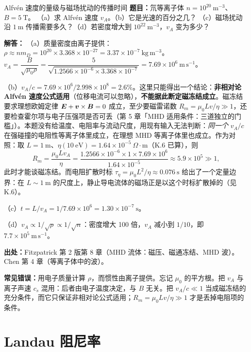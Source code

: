 \begin{example}{Alfvén 速度的量级与磁场扰动的传播时间}{}
\textbf{题目：}氘等离子体 $n=10^{20}\ \mathrm{m^{-3}}$、$B=5\ \mathrm{T}$。
（a）求 Alfvén 速度 $v_A$。（b）它是光速的百分之几？
（c）磁场扰动沿 $1\ \mathrm{m}$ 传播需要多久？（d）若密度增大到 $10^{22}\ \mathrm{m^{-3}}$，$v_A$ 变为多少？

\textbf{解答：}
（a）质量密度由离子提供：$\rho\approx nm_D=10^{20}\times3.368\times10^{-27}=3.37\times10^{-7}\ \mathrm{kg\,m^{-3}}$。
$v_A=\dfrac{B}{\sqrt{\mu_0\rho}}
=\dfrac{5}{\sqrt{1.2566\times10^{-6}\times3.368\times10^{-7}}}
=7.69\times10^{6}\ \mathrm{m\,s^{-1}}$。

（b）$v_A/c=7.69\times10^{6}/2.998\times10^{8}=2.6\%$。这里只能得出一个结论：\textbf{非相对论 Alfvén 速度公式适用}（位移电流可以忽略），\textbf{不能据此断定磁冻结成立}。磁冻结要求理想欧姆定律 $\bm{E}+\bm{v}\times\bm{B}=0$ 成立，至少要磁雷诺数 $R_m=\mu_0Lv/\eta\gg1$，还要检查霍尔项与电子压强项是否可丢（第 5 章「MHD 适用条件：三道独立的门槛」）。本题没有给温度、电阻率与流动尺度，用现有输入无法判断：\emph{同一个} $v_A/c$ 在强碰撞的电阻性等离子体里成立，在理想 MHD 等离子体里也成立。作为对照：取 $L=1\ \mathrm{m}$、$\eta(10\ \mathrm{eV})=1.64\times10^{-5}\ \Omega\cdot\mathrm{m}$（K.6 已算），则
\[
R_m=\frac{\mu_0Lv_A}{\eta}
=\frac{1.2566\times10^{-6}\times1\times7.69\times10^{6}}{1.64\times10^{-5}}
\approx5.9\times10^{5}\gg1,
\]
此时才能谈磁冻结。而电阻扩散时标 $\tau_\eta=\mu_0L^2/\eta\approx0.076\ \mathrm{s}$ 给出了一个定量边界：在 $L\sim1\ \mathrm{m}$ 的尺度上，静止导电流体的磁场正是以这个时标扩散掉的（见 K.6）。

（c）$t=L/v_A=1/7.69\times10^{6}=1.30\times10^{-7}\ \mathrm{s}$。

（d）$v_A\propto1/\sqrt{\rho}\propto1/\sqrt{n}$：密度增大 100 倍，$v_A$ 减小到 $1/10$，即 $7.7\times10^{5}\ \mathrm{m\,s^{-1}}$。

{\footnotesize
\textbf{出处：}Fitzpatrick 第 2 版第 8 章（MHD 流体：磁压、磁通冻结、MHD 波）。
Chen 第 4 章（等离子体中的波）。
}

\textbf{常见错误：}用电子质量计算 $\rho$，而惯性由离子提供。忘记 $\mu_0$ 的平方根。把 $v_A$ 与离子声速 $c_s$ 混用：后者由电子温度决定，与 $B$ 无关。把 $v_A/c\ll1$ 当成磁冻结的充分条件，而它只保证非相对论公式适用；$R_m=\mu_0Lv/\eta\gg1$ 才是丢掉电阻项的条件。
\end{example}


\section{Landau 阻尼率}

